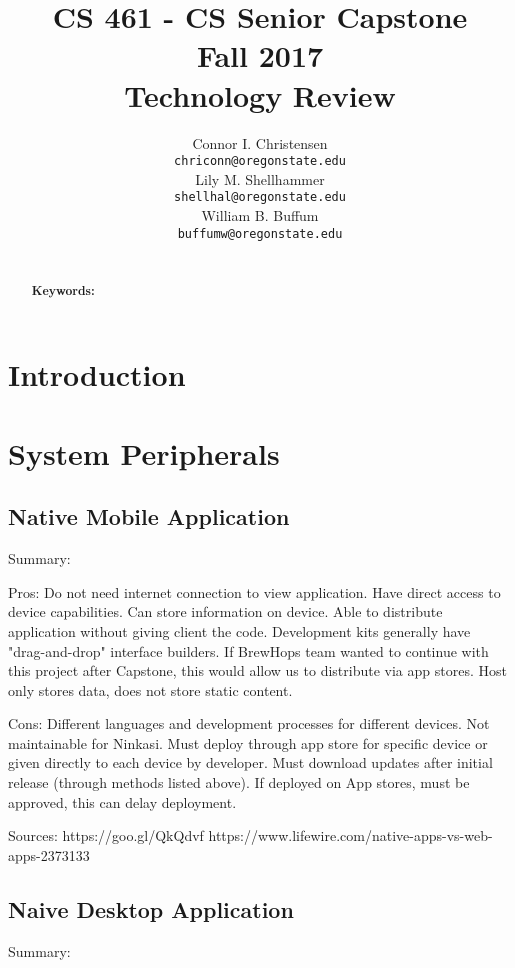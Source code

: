 \documentclass[draftclsnofoot,onecolumn,letterpaper,10pt,compsoc]{IEEEtran}
\title{CS 461 - CS Senior Capstone
	\\Fall 2017
	\\Technology Review
}
\author{
	Connor I. Christensen \\
	\texttt{chriconn@oregonstate.edu}
	\\
	Lily M. Shellhammer \\
	\texttt{shellhal@oregonstate.edu}
	\\
	William B. Buffum \\
	\texttt{buffumw@oregonstate.edu}
}
\begin{document}
\begin{titlingpage}
    \maketitle
    \begin{abstract}
			\\
			\textbf{Keywords:}
    \end{abstract}
		\pagebreak
		\tableofcontents
\end{titlingpage}

\section{Introduction}

\section{System Peripherals}
	\subsection{Native Mobile Application}
    Summary:
    
    Pros:
        Do not need internet connection to view application.
        Have direct access to device capabilities.
        Can store information on device.
        Able to distribute application without giving client the code.
        Development kits generally have "drag-and-drop" interface builders.
        If BrewHops team wanted to continue with this project after             Capstone, this would allow us to distribute via app stores.
        Host only stores data, does not store static content.
        
    Cons:
        Different languages and development processes for different devices.
        Not maintainable for Ninkasi.
        Must deploy through app store for specific device or given directly     to each device by developer.
        Must download updates after initial release (through methods listed     above).
        If deployed on App stores, must be approved, this can delay             deployment.
    
    Sources:
    https://goo.gl/QkQdvf
    https://www.lifewire.com/native-apps-vs-web-apps-2373133
        
    
	\subsection{Naive Desktop Application}
    Summary:
    
\end{document}
